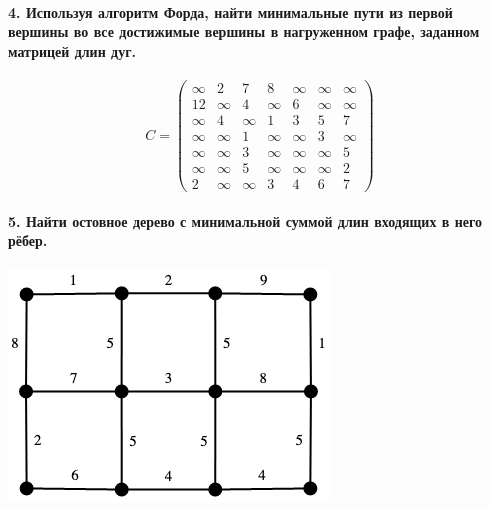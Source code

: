 \documentclass[12pt,a4paper]{article}
\begin{document}
\paragraph*{4. Используя алгоритм Форда, найти минимальные пути из первой вершины во все достижимые вершины в нагруженном графе, заданном матрицей длин дуг.}
      \[
         C = \begin{pmatrix}
            \infty & 2 & 7 & 8 & \infty & \infty & \infty \\
            12 & \infty & 4 & \infty & 6 & \infty & \infty \\
            \infty & 4 & \infty & 1 & 3 & 5 & 7 \\
            \infty & \infty & 1 & \infty & \infty & 3 & \infty \\
            \infty & \infty & 3 & \infty & \infty & \infty & 5 \\
            \infty & \infty & 5 & \infty & \infty & \infty & 2 \\
            2 & \infty & \infty & 3 & 4 & 6 & 7
         \end{pmatrix}
      \]

\paragraph*{5. Найти остовное дерево с минимальной суммой длин входящих в него рёбер.}
   \begin{center}
      \includegraphics[scale=0.7]{spanning_tree.png}
   \end{center}
\end{document}

